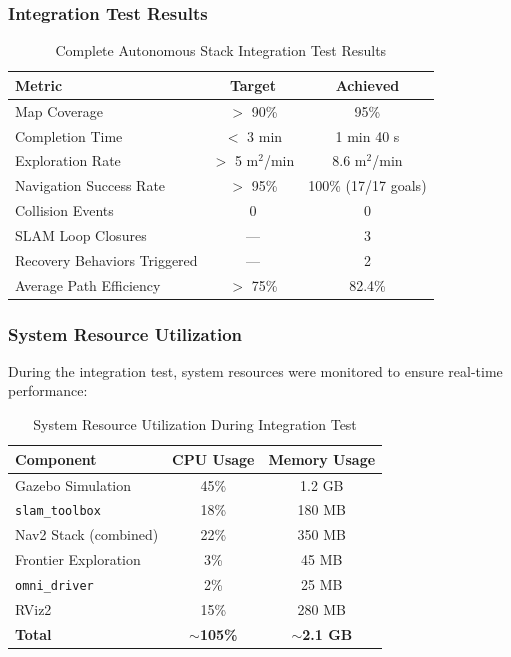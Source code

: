 \subsubsection{Integration Test Results}

\begin{table}[H]
\centering
\caption{Complete Autonomous Stack Integration Test Results}
\label{tab:complete_stack_results}
\begin{tabular}{|l|c|c|}
\hline
\textbf{Metric} & \textbf{Target} & \textbf{Achieved} \\
\hline
Map Coverage & $>$ 90\% & 95\% \\
Completion Time & $<$ 3 min & 1 min 40 s \\
Exploration Rate & $>$ 5 m$^2$/min & 8.6 m$^2$/min \\
Navigation Success Rate & $>$ 95\% & 100\% (17/17 goals) \\
Collision Events & 0 & 0 \\
SLAM Loop Closures & --- & 3 \\
Recovery Behaviors Triggered & --- & 2 \\
Average Path Efficiency & $>$ 75\% & 82.4\% \\
\hline
\end{tabular}
\end{table}

\subsubsection{System Resource Utilization}

During the integration test, system resources were monitored to ensure real-time performance:

\begin{table}[H]
\centering
\caption{System Resource Utilization During Integration Test}
\label{tab:integration_resources}
\begin{tabular}{|l|c|c|}
\hline
\textbf{Component} & \textbf{CPU Usage} & \textbf{Memory Usage} \\
\hline
Gazebo Simulation & 45\% & 1.2 GB \\
\texttt{slam\_toolbox} & 18\% & 180 MB \\
Nav2 Stack (combined) & 22\% & 350 MB \\
Frontier Exploration & 3\% & 45 MB \\
\texttt{omni\_driver} & 2\% & 25 MB \\
RViz2 & 15\% & 280 MB \\
\hline
\textbf{Total} & \textbf{$\sim$105\%} & \textbf{$\sim$2.1 GB} \\
\hline
\end{tabular}
\end{table}

